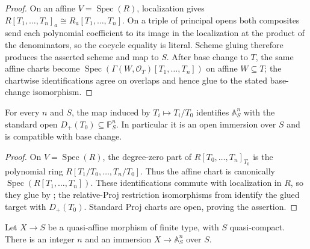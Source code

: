 \begin{proof}
  On an affine $V=\operatorname{Spec}(R)$, localization gives
  $R[T_1,\ldots,T_n]_a\cong R_a[T_1,\ldots,T_n]$.  On a triple of principal
  opens both composites send each polynomial coefficient to its image in the
  localization at the product of the denominators, so the cocycle equality is
  literal.  Scheme gluing therefore produces the asserted scheme and map to
  $S$.  After base change to $T$, the same affine charts become
  $\operatorname{Spec}(\Gamma(W,\mathcal O_T)[T_1,\ldots,T_n])$ on affine
  $W\subseteq T$; the chartwise identifications agree on overlaps and hence
  glue to the stated base-change isomorphism.
\end{proof}

\begin{lemma}
  \label{lemma:nagata-relative-affine-space-open-immersion}

  For every $n$ and $S$, the map induced by
  $T_i\mapsto T_i/T_0$ identifies $\mathbb A^n_S$ with the standard open
  $D_+(T_0)\subseteq\mathbb P^n_S$.  In particular it is an open immersion
  over $S$ and is compatible with base change.
\end{lemma}

\begin{proof}
  On $V=\operatorname{Spec}(R)$, the degree-zero part of
  $R[T_0,\ldots,T_n]_{T_0}$ is the polynomial ring
  $R[T_1/T_0,\ldots,T_n/T_0]$.  Thus the affine chart is canonically
  $\operatorname{Spec}(R[T_1,\ldots,T_n])$.  These identifications commute
  with localization in $R$, so they glue by
  ; the relative-Proj
  restriction isomorphisms from
   identify the glued target with
  $D_+(T_0)$.  Standard Proj charts are open, proving the assertion.
\end{proof}

\begin{lemma}
  \label{lemma:nagata-quasi-affine-immersion-affine-space-exists}

  Let $X\to S$ be a quasi-affine morphism of finite type, with $S$
  quasi-compact.  There is an integer $n$ and an immersion
  $X\to\mathbb A^n_S$ over $S$.
\end{lemma}

